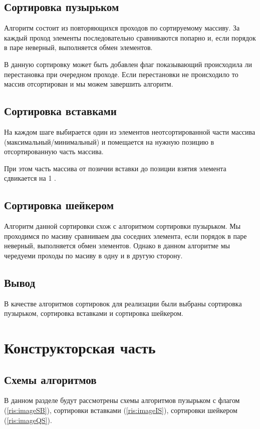\documentclass[12pt]{report}
\begin{document}
\section{Сортировка пузырьком}
Алгоритм состоит из повторяющихся проходов по сортируемому массиву. За каждый проход элементы последовательно сравниваются попарно и, если порядок в паре неверный, выполняется обмен элементов.

В данную сортировку может быть добавлен флаг показывающий происходила ли перестановка при очередном проходе. Если перестановки не происходило то массив отсортирован и мы можем завершить алгоритм.

\section{Сортировка вставками}
На каждом шаге выбирается один из элементов неотсортированной части массива (максимальный/минимальный) 
и помещается на нужную позицию в отсортированную часть массива. 

При этом часть массива от позичии вставки до позиции взятия элемента сдвикается на 1 .

\section{Сортировка шейкером}
Алгоритм данной сортировки схож с алгоритмом сортировки пузырьком. Мы проходимся по масиву сравниваем два соседних элемента, если порядок в паре неверный, выполняется обмен элементов. Однако в данном алгоритме мы чередуеми проходы по масиву в одну и в другую сторону.

\section{Вывод}
В качестве алгоритмов сортировок для реализации были выбраны сортировка пузырьком, сортировка вставками и сортировка шейкером.

\chapter{Конструкторская часть}
\section{Схемы алгоритмов}
В данном разделе будут рассмотрены схемы алгоритмов пузырьком с флагом (\ref{ris:imageSB}), сортировки вставками (\ref{ris:imageIS}), сортировки шейкером (\ref{ris:imageQS}).
\end{document}
